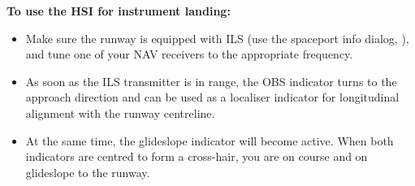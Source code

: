 \documentclass[Orbiter User Manual.tex]{subfiles}
\begin{document}
\noindent
\textbf{To use the HSI for instrument landing:}

\begin{itemize}
\item Make sure the runway is equipped with ILS (use the spaceport info dialog, \Ctrl{}), and tune one of your NAV receivers to the appropriate frequency.
\item As soon as the ILS transmitter is in range, the OBS indicator turns to the approach direction and can be used as a localiser indicator for longitudinal alignment with the runway centreline.
\item At the same time, the glideslope indicator will become active. When both indicators are centred to form a cross-hair, you are on course and on glideslope to the runway.
\end{itemize}
\end{document}
